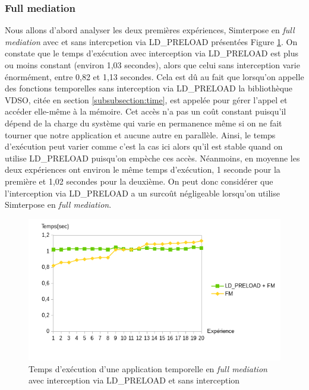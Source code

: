 \subsubsection{Full mediation}
Nous allons d'abord analyser les deux premières expériences, Simterpose en \textit{full mediation} avec et sans intercpetion via LD\_PRELOAD présentées Figure \ref{Temps_FM}. On constate que le temps d'exécution avec interception via LD\_PRELOAD est plus ou moins constant (environ 1,03 secondes), alors que celui sans interception varie énormément, entre 0,82 et 1,13 secondes. Cela est dû au fait que lorsqu'on appelle des fonctions temporelles sans interception via LD\_PRELOAD la bibliothèque VDSO, citée en section \ref{subsubsection:time}, est appelée pour gérer l'appel et accéder elle-même à la mémoire. Cet accès n'a pas un coût constant puisqu'il dépend de la charge du système qui varie en permanence même si on ne fait tourner que notre application et aucune autre en parallèle. Ainsi, le temps d'exécution peut varier comme c'est la cas ici alors qu'il est stable quand on utilise LD\_PRELOAD puisqu'on empèche ces accès. Néanmoins, en moyenne les deux expériences ont environ le même temps d'exécution, 1 seconde pour la première et 1,02 secondes pour la deuxième. On peut donc considérer que l'interception via LD\_PRELOAD a un surcoût négligeable lorsqu'on utilise Simterpose en \textit{full mediation}.

\begin{figure}
  \centering
    \includegraphics[scale=0.80]{mesures/graph/Temps_FM.png}
    \caption{Temps d'exécution d'une application temporelle en \textit{full mediation} avec interception via LD\_PRELOAD et sans interception}
    \label{Temps_FM}
\end{figure}

